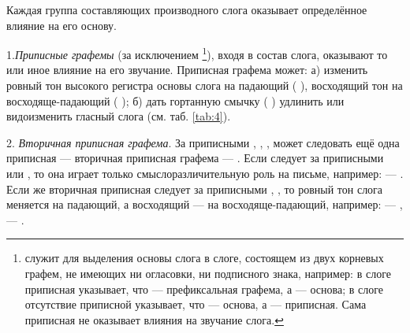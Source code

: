 Каждая группа составляющих производного слога оказывает определённое влияние на его основу.

1.\emph{Приписные графемы} (за исключением \footnote[11]{ служит для выделения основы слога в слоге, состоящем из двух корневых графем, не имеющих ни огласовки, ни подписного знака, например: в слоге  приписная  указывает, что  --- префиксальная графема, а  --- основа; в слоге  отсутствие приписной  указывает, что  --- основа, а  --- приписная. Сама приписная не оказывает влияния на звучание слога.}), входя в состав слога, оказывают то или иное влияние на его звучание. Приписная графема может: а) изменить ровный тон высокого регистра основы слога на падающий
(  \toneN ), восходящий тон на восходяще-падающий (  \toneVN ); б) дать гортанную смычку ( \toneG ) удлинить или видоизменить гласный слога (см. таб. \ref{tab:4}).

2. \emph{Вторичная приписная графема}. За приписными , , ,  может следовать ещё одна приписная --- вторичная приписная графема --- . Если  следует за приписными  или , то она играет только смыслоразличительную роль на письме, например:  --- . Если же вторичная приписная следует за приписными , , то ровный тон слога меняется на падающий, а восходящий --- на восходяще-падающий, например:  ---  , --- .

